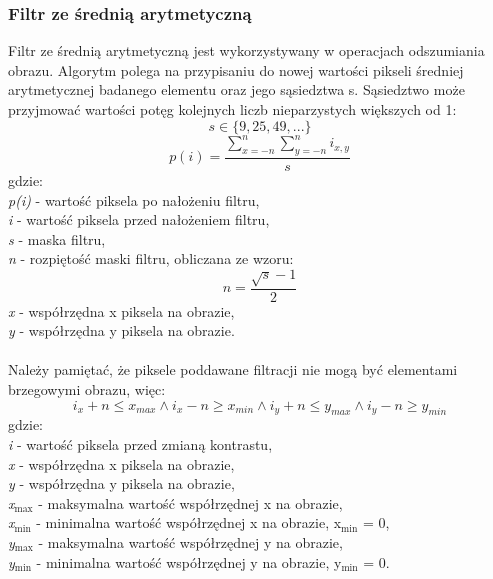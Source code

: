 \documentclass{classrep}
\begin{document}
\subsubsection{Filtr ze średnią arytmetyczną}
Filtr ze średnią arytmetyczną jest wykorzystywany w operacjach odszumiania obrazu. Algorytm polega na przypisaniu do nowej wartości pikseli średniej arytmetycznej badanego elementu oraz jego sąsiedztwa s. Sąsiedztwo może przyjmować wartości potęg kolejnych liczb nieparzystych większych od 1:\\
\[ s \in \{9,25,49,...\} \]
\[ p(i) = \frac{\displaystyle\sum_{x=-n}^{n}\displaystyle\sum_{y=-n}^{n} i_{x,y}}{s} \]
gdzie:\\
\textit{p(i)} - wartość piksela po nałożeniu filtru,\\
\textit{i} - wartość piksela przed nałożeniem filtru,\\
\textit{s} - maska filtru,\\
\textit{n} - rozpiętość maski filtru, obliczana ze wzoru:\\
\[ n = \frac{\sqrt{s}-1}{2} \]
\textit{x} - współrzędna x piksela na obrazie,\\
\textit{y} - współrzędna y piksela na obrazie.\\
\\
Należy pamiętać, że piksele poddawane filtracji nie mogą być elementami brzegowymi obrazu, więc:
\[ i_x + n \leq x_{max} \wedge i_x - n \geq x_{min} \wedge i_y + n \leq y_{max} \wedge i_y - n \geq y_{min} \]
gdzie:\\
\textit{i} - wartość piksela przed zmianą kontrastu,\\
\textit{x} - współrzędna x piksela na obrazie,\\
\textit{y} - współrzędna y piksela na obrazie,\\
\textit{x$_{\text{max}}$} - maksymalna wartość współrzędnej x na obrazie,\\
\textit{x$_{\text{min}}$} - minimalna wartość współrzędnej x na obrazie, x$_{\text{min}}$ = 0,\\
\textit{y$_{\text{max}}$} - maksymalna wartość współrzędnej y na obrazie,\\
\textit{y$_{\text{min}}$} - minimalna wartość współrzędnej y na obrazie, y$_{\text{min}}$ = 0.\\
\end{document}
